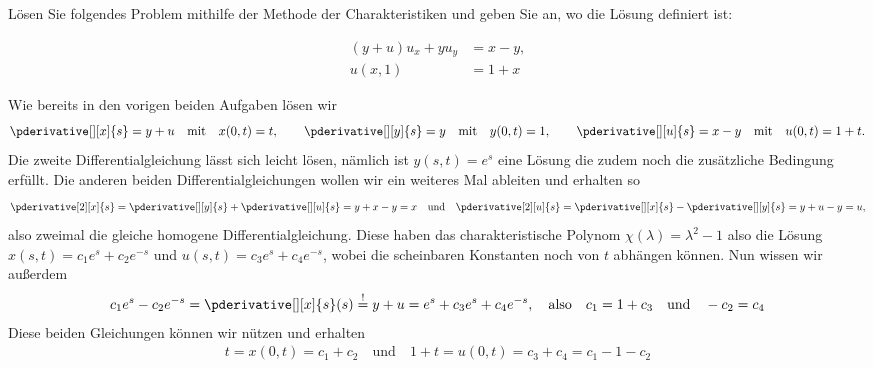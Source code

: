 
\begin{exercise}

Lösen Sie folgendes Problem mithilfe der Methode der Charakteristiken und geben Sie an, wo die Lösung definiert ist:

\begin{align*}
    (y + u) u_x + y u_y
    & =
    x - y, \\
    u(x, 1)
    & =
    1 + x
\end{align*}

\end{exercise}


\begin{solution}
Wie bereits in den vorigen beiden Aufgaben lösen wir
\begin{align*}
\pderivative[][x]{s} = y + u \quad \text{mit} \quad x(0,t) = t, \qquad
\pderivative[][y]{s} = y \quad \text{mit} \quad y(0,t) = 1, \qquad
\pderivative[][u]{s} = x - y \quad \text{mit} \quad u(0,t) = 1 + t .
\end{align*}
Die zweite Differentialgleichung lässt sich leicht lösen, nämlich ist $y(s,t) = e^s$ eine Lösung die zudem noch die zusätzliche Bedingung erfüllt. Die anderen beiden Differentialgleichungen wollen wir ein weiteres Mal ableiten und erhalten so
\begin{align*}
\pderivative[2][x]{s} = \pderivative[][y]{s} + \pderivative[][u]{s} = y  + x - y = x \quad \text{und} \quad \pderivative[2][u]{s} = \pderivative[][x]{s} - \pderivative[][y]{s} = y + u - y = u,
\end{align*}
also zweimal die gleiche homogene Differentialgleichung. Diese haben das charakteristische Polynom $\chi(\lambda) = \lambda^2 -1$ also die Lösung $x(s,t) = c_1 e^s + c_2 e^{-s}$ und $u(s,t) = c_3 e^s + c_4 e^{-s}$, wobei die scheinbaren Konstanten noch von $t$ abhängen können. Nun wissen wir außerdem 
\begin{align*}
c_1 e^s - c_2 e^{-s} = \pderivative[][x]{s}(s)\stackrel{!}{=} y + u = e^s + c_3 e^s + c_4 e^{-s}, \quad \text{also} \quad c_1 = 1 + c_3 \quad \text{und} \quad -c_2 = c_4 
\end{align*}
Diese beiden Gleichungen können wir nützen und erhalten 
\begin{align*}
t = x(0,t) = c_1 + c_2 \quad \text{und} \quad 1 + t = u(0,t) = c_3 + c_4 = c_1 - 1 - c_2

\end{align*}
\end{solution}
